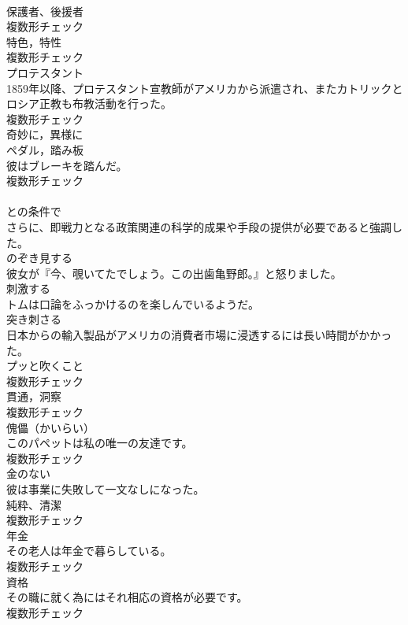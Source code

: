 \documentclass[8pt]{extreport}
\begin{document}
\begin{CJK}{UTF8}{min}
\\	[名詞]	保護者、後援者	
\\	複数形チェック
\\	[名詞]	特色，特性	
\\	複数形チェック
\\	[名詞]	プロテスタント	
\\	1859年以降、プロテスタント宣教師がアメリカから派遣され、またカトリックとロシア正教も布教活動を行った。	
\\	複数形チェック
\\	[副詞]	奇妙に，異様に	
\\	[名詞]	ペダル，踏み板	
\\	彼はブレーキを踏んだ。	
\\	複数形チェック
\\	[接続詞]	
\\	との条件で	
\\	さらに、即戦力となる政策関連の科学的成果や手段の提供が必要であると強調した。	
\\	[動詞]	のぞき見する	
\\	彼女が『今、覗いてたでしょう。この出歯亀野郎。』と怒りました。	
\\	[動詞]	刺激する	
\\	トムは口論をふっかけるのを楽しんでいるようだ。	
\\	[動詞]	突き刺さる	
\\	日本からの輸入製品がアメリカの消費者市場に浸透するには長い時間がかかった。	
\\	[名詞]	プッと吹くこと	
\\	複数形チェック
\\	[名詞]	貫通，洞察	
\\	複数形チェック
\\	[名詞]	傀儡（かいらい）	
\\	このパペットは私の唯一の友達です。	
\\	複数形チェック
\\	[形容詞]	金のない	
\\	彼は事業に失敗して一文なしになった。	
\\	[名詞]	純粋、清潔	
\\	複数形チェック
\\	[名詞]	年金	
\\	その老人は年金で暮らしている。	
\\	複数形チェック
\\	[名詞]	資格	
\\	その職に就く為にはそれ相応の資格が必要です。	
\\	複数形チェック

\end{CJK}
\end{document}
